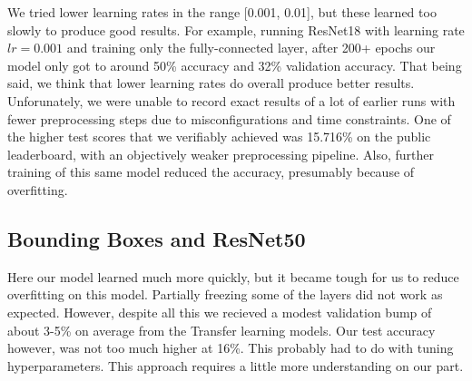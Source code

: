 We tried lower learning rates in the range [0.001, 0.01], but these learned too slowly to produce good results. For example, running ResNet18 with learning rate $lr = 0.001$ and training only the fully-connected layer, after 200+ epochs our model only got to around 50\% accuracy and 32\% validation accuracy. That being said, we think that lower learning rates do overall produce better results. Unforunately, we were unable to record exact results of a lot of earlier runs with fewer preprocessing steps due to misconfigurations and time constraints. One of the higher test scores that we verifiably achieved was 15.716\% on the public leaderboard, with an objectively weaker preprocessing pipeline. Also, further training of this same model reduced the accuracy, presumably because of overfitting.

\subsection{Bounding Boxes and ResNet50}

Here our model learned much more quickly, but
it became tough for us to reduce overfitting on this model. Partially freezing some of the layers did not work as expected. However, despite all this we recieved a modest validation bump of about 3-5\% on average from the Transfer learning models. Our test accuracy however, was not too much higher at 16\%. This probably had to do with tuning hyperparameters. This approach requires a little more understanding on our part. 


